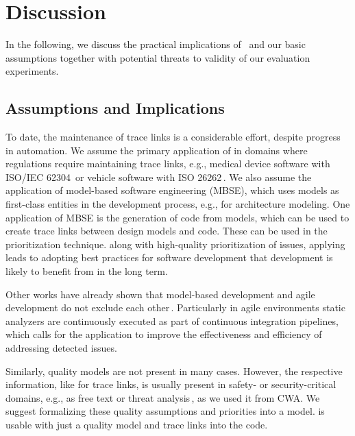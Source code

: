 \section{Discussion}\label{sec:disc}

In the following, we discuss the practical implications of \appr\ and our basic assumptions together with potential threats to validity of our evaluation experiments.

\subsection{Assumptions and Implications}
\label{sec:implication}
To date, the maintenance of trace links is a considerable effort, despite progress in automation.
We assume the primary application of \appr{} in domains where regulations require maintaining  trace links, e.g., medical device software with ISO/IEC 62304\,\cite{IEC62304} or vehicle software with ISO 26262\,\cite{ISO26262}.
We also assume the application of model-based software engineering (MBSE), which uses models as first-class entities in the development process, e.g., for architecture modeling.
One application of MBSE is the generation of code from models, which can be used to create trace links between design models and code.
These can be used in the \appr{} prioritization technique.
 along with high-quality prioritization of issues, applying \appr{} leads to adopting best practices for software development that development is likely to benefit from in the long term.

Other works have already shown that model-based development and agile development do not exclude each other\,\cite{Gray2018}.
Particularly in agile environments static analyzers are continuously executed as part of continuous integration pipelines, which calls for the application \appr{} to improve the effectiveness and efficiency of addressing detected issues.

Similarly, quality models are not present in many cases.
However, the respective information, like for trace links, is usually present in safety- or security-critical domains, e.g., as free text or threat analysis\,\cite{TUMA2018275}, as we used it from CWA.
We suggest formalizing  these quality assumptions and priorities into a model.
\appr{} is usable with just a quality model and trace links into the code.


